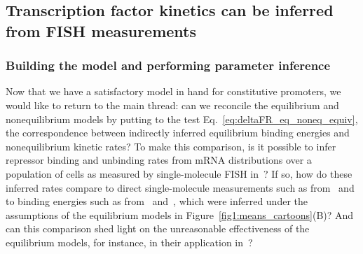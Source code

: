 \subsection{Transcription factor kinetics can be inferred from FISH
measurements}\label{sec:rep_kinetics_inference}
\subsubsection{Building the model and performing parameter inference}

Now that we have a satisfactory model in hand for constitutive promoters, we
would like to return to the main thread: can we reconcile the equilibrium
and nonequilibrium models by putting to the test
Eq.~\ref{eq:deltaFR_eq_noneq_equiv}, the correspondence between indirectly
inferred equilibrium binding energies and nonequilibrium kinetic rates?
To make this comparison, is it possible to infer repressor binding and
unbinding rates from mRNA distributions over a population of cells as measured
by single-molecule FISH in~\cite{Jones2014}? If so, how do these inferred rates
compare to direct single-molecule measurements such as from~\cite{Hammar2014}
and to binding energies such as from~\cite{Garcia2011a}
and~\cite{Razo-Mejia2018}, which were inferred under the assumptions of the
equilibrium models in Figure~\ref{fig1:means_cartoons}(B)? And can this
comparison shed light on the unreasonable effectiveness of the equilibrium
models, for instance, in their application in~\cite{Chure2019, Chure2019a}?

